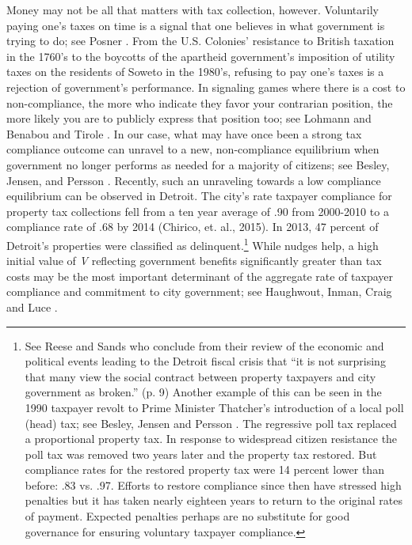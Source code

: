 \documentclass[12pt]{article}
\begin{document}
Money may not be all that matters with tax collection, however.
Voluntarily paying one's taxes on time is a signal that one believes
in what government is trying to do; see Posner
\citeyear{Posner-00}. From the
U.S. Colonies' resistance to British taxation in the 1760's to the
boycotts of the apartheid government's imposition of utility taxes on the residents of Soweto in the 1980's, refusing to pay one's
taxes is a rejection of government's performance.  In signaling games where there is a cost to
non-compliance, the more who indicate they favor your contrarian
position, the more likely you are to publicly express that position
too; see Lohmann \citeyear{lohmann1994dynamics} and Benabou and Tirole
\citeyear{benabou2011laws}.  In our case, what may have once been a
strong tax compliance outcome can unravel to a new, non-compliance
equilibrium when government no longer performs as needed for a majority of citizens; see Besley, Jensen, and Persson
\citeyear{besley2015norms}.  Recently, such an unraveling towards a
low compliance equilibrium can be observed in Detroit. The city's rate
taxpayer compliance for property tax collections fell from a ten year
average of .90 from 2000-2010 to a compliance rate of .68 by 2014
(Chirico, et. al., 2015).  In 2013, 47 percent of
Detroit's properties were classified as delinquent.\footnote{See Reese
  and Sands \citeyear{reese2013no} who conclude from their review of
  the economic and political events leading to the Detroit fiscal
  crisis that ``it is not surprising that many view the social
  contract between property taxpayers and city government as broken.''
  (p. 9) Another example of this can be seen in the 1990 taxpayer
  revolt to Prime Minister Thatcher's introduction of a local poll
  (head) tax; see Besley, Jensen and Persson
  \citeyear{besley2015norms}.  The regressive poll tax replaced a
  proportional property tax.  In response to widespread citizen
  resistance the poll tax was removed two years later and the property
  tax restored.  But compliance rates for the restored property tax
  were 14 percent lower than before: .83 vs. .97.  Efforts to restore
  compliance since then have stressed high penalties but it has taken
  nearly eighteen years to return to the original rates of payment.
  Expected penalties perhaps are no substitute for good governance for
  ensuring voluntary taxpayer compliance.} While nudges help, a high initial value of \textit{V} reflecting government benefits significantly greater than tax costs may be the most important determinant of the aggregate rate of taxpayer compliance and commitment to city government; see Haughwout, Inman, Craig and Luce \citeyear{haughwout2004local}.
\end{document}
